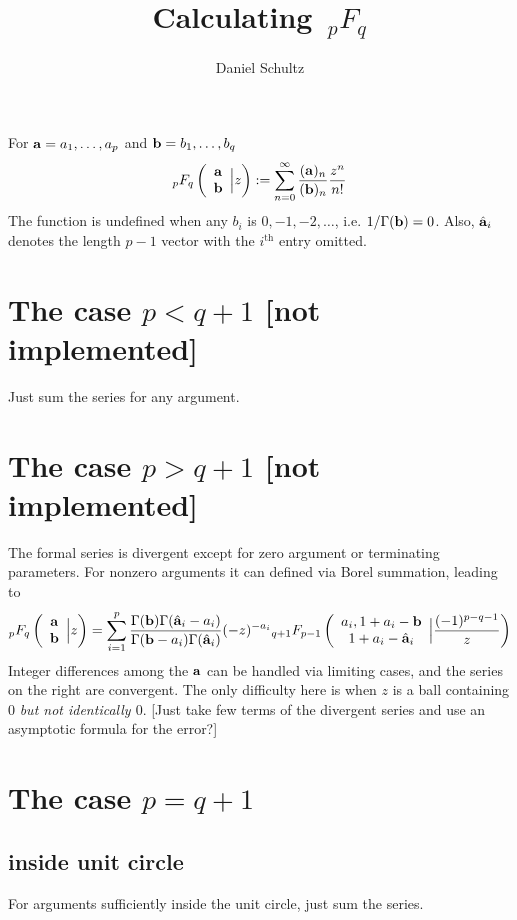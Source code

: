\documentclass[10pt]{article}
\author{Daniel Schultz}
\title{Calculating $\, _{p}F_{q}$}
\date{}
\newcommand{\F}[5] {{}_{#1}F_{#2} \left( \begin{array}{c} #3 \\ #4 \end{array} \Big| #5  \right)}
\begin{document}
\maketitle

For $\bold{a}=a_1,\dots,a_p$ and  $\bold{b}=b_1,\dots,b_q$
\begin{equation}
\label{Fdef}
\F{p}{q}{\bold{a}}{\bold{b}}{z} := \sum_{n=0}^{\infty} \frac{(\bold{a})_n}{(\bold{b})_n} \frac{z^n}{n!}
\end{equation}
The function is undefined when any $b_i$ is $0,-1,-2,\dots$, i.e. $1/\Gamma(\bold{b}) = 0$. Also, $\hat{\bold{a}}_i$ denotes the length $p-1$ vector with the $i^{\text{th}}$ entry omitted.

\section{The case $p < q+1$ [not implemented]}
Just sum the series for any argument.

\section{The case $p > q+1$ [not implemented]}
The formal series is divergent except for zero argument or terminating parameters. For nonzero arguments it can defined via Borel summation, leading to
\begin{equation*}
\F{p}{q}{\bold{a}}{\bold{b}}{z} = \sum_{i=1}^{p} \frac{\Gamma(\bold{b}) \Gamma(\hat{\bold{a}}_i-a_i)}{\Gamma(\bold{b}-a_i) \Gamma(\hat{\bold{a}}_i)} (-z)^{-a_i} \F{q+1}{p-1}{a_i,1+a_i-\bold{b}}{1+a_i-\hat{\bold{a}}_i}{\frac{(-1)^{p-q-1}}{z}}
\end{equation*}
Integer differences among the $\bold{a}$ can be handled via limiting cases, and the series on the right are convergent. The only difficulty here is when $z$ is a ball containing $0$ \emph{but not identically $0$}. [Just take few terms of the divergent series and use an asymptotic formula for the error?]

\section{The case $p=q+1$}

\subsection{inside unit circle}
For arguments sufficiently inside the unit circle, just sum the series.
\end{document}
